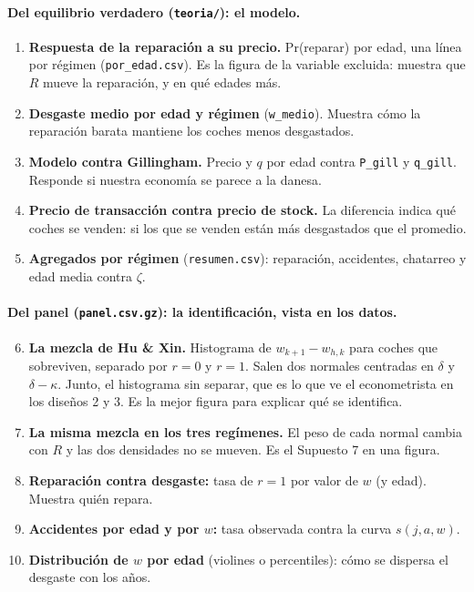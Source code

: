 \documentclass[11pt]{article}
\newcommand{\col}[1]{\texttt{#1}}
\begin{document}
\paragraph{Del equilibrio verdadero (\texttt{teoria/}): el modelo.}
\begin{enumerate}
  \item \textbf{Respuesta de la reparación a su precio.} Pr(reparar) por edad, una línea por
  régimen (\texttt{por\_edad.csv}). Es la figura de la variable excluida: muestra que $R$
  mueve la reparación, y en qué edades más.
  \item \textbf{Desgaste medio por edad y régimen} (\col{w\_medio}). Muestra cómo la reparación
  barata mantiene los coches menos desgastados.
  \item \textbf{Modelo contra Gillingham.} Precio y $q$ por edad contra \col{P\_gill} y
  \col{q\_gill}. Responde si nuestra economía se parece a la danesa.
  \item \textbf{Precio de transacción contra precio de stock.} La diferencia indica qué coches
  se venden: si los que se venden están más desgastados que el promedio.
  \item \textbf{Agregados por régimen} (\texttt{resumen.csv}): reparación, accidentes,
  chatarreo y edad media contra $\zeta$.
\end{enumerate}

\paragraph{Del panel (\texttt{panel.csv.gz}): la identificación, vista en los datos.}
\begin{enumerate}
  \setcounter{enumi}{5}
  \item \textbf{La mezcla de Hu \& Xin.} Histograma de $w_{k+1}-w_{h,k}$ para coches que
  sobreviven, separado por $r=0$ y $r=1$. Salen dos normales centradas en $\delta$ y
  $\delta-\kappa$. Junto, el histograma sin separar, que es lo que ve el econometrista en los
  diseños 2 y 3. Es la mejor figura para explicar qué se identifica.
  \item \textbf{La misma mezcla en los tres regímenes.} El peso de cada normal cambia con $R$
  y las dos densidades no se mueven. Es el Supuesto 7 en una figura.
  \item \textbf{Reparación contra desgaste:} tasa de $r=1$ por valor de $w$ (y edad). Muestra
  quién repara.
  \item \textbf{Accidentes por edad y por $w$:} tasa observada contra la curva
  $s(j,a,w)$.
  \item \textbf{Distribución de $w$ por edad} (violines o percentiles): cómo se dispersa el
  desgaste con los años.
\end{enumerate}
\end{document}

